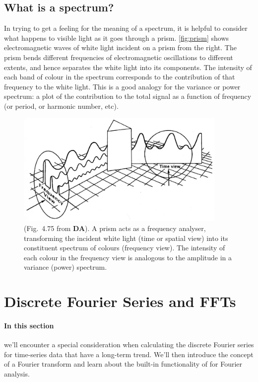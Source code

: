 \documentclass[11pt,twoside,a4paper]{article}
\begin{document}
\subsection{What is a spectrum?}

In trying to get a feeling for the meaning of a spectrum, it is
helpful to consider what happens to visible light as it goes through a
prism. \autoref{fig:prism} shows electromagnetic waves of white light
incident on a prism from the right.  The prism bends different
frequencies of electromagnetic oscillations to different extents, and
hence separates the white light into its components.  The intensity of
each band of colour in the spectrum corresponds to the contribution of
that frequency to the white light.  This is a good analogy for the
variance or power spectrum: a plot of the contribution to the total
signal as a function of frequency (or period, or harmonic number,
etc).

\begin{figure}
  \centering
  \includegraphics[width=4in]{../figs/L16/FourierPrism}
  \caption{(Fig.~4.75 from \textbf{DA}). A prism acts as a frequency
    analyser, transforming the incident white light (time or spatial
    view) into its constituent spectrum of colours (frequency
    view). The intensity of each colour in the frequency view is
    analogous to the amplitude in a variance (power) spectrum.
    \vspace{5mm}}
  \label{fig:prism}
\end{figure}


\section{Discrete Fourier Series and FFTs}
\label{sec:intro_timeseries}

\paragraph{In this section} we'll encounter a special consideration
when calculating the discrete Fourier series for time-series data that
have a long-term trend. We'll then introduce the concept of a Fourier
transform and learn about the built-in functionality of \Mlab for
Fourier analysis.
\end{document}
